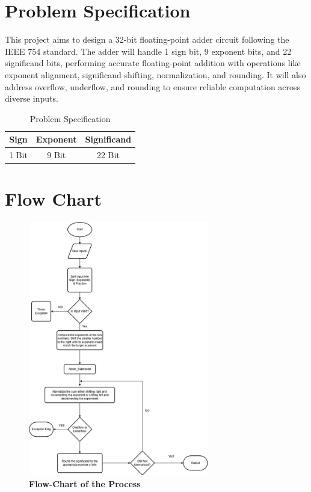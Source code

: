 \documentclass{article}
\begin{document}
\section{Problem Specification}
This project aims to design a 32-bit floating-point adder circuit following the IEEE 754 standard. The adder will handle 1 sign bit, 9 exponent bits, and 22 significand bits, performing accurate floating-point addition with operations like exponent alignment, significand shifting, normalization, and rounding. It will also address overflow, underflow, and rounding to ensure reliable computation across diverse inputs.
\\ 

\begin{table}[h]
    \centering 
    \begin{tabular}{|c|c|c|}
        \hline 
        \textbf{Sign} & \textbf{Exponent} & \textbf{Significand} \\ 
        \hline 
        1 Bit & 9 Bit & 22 Bit \\ 
        \hline 
    \end{tabular}
    \caption{Problem Specification}
\end{table} 
\pagebreak 
\section{Flow Chart}
\begin{figure}[h]
    \centering
    \includegraphics[width=0.7\textwidth]{flowchart.jpg}
    \caption{\textbf{Flow-Chart of the Process}}
\end{figure}
\pagebreak 
\end{document}
